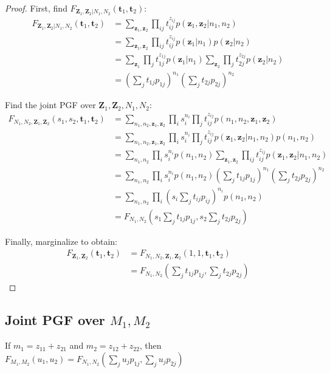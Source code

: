 \documentclass{article}
\begin{document}
\begin{proof}
First, find $F_{\mathbf{Z}_1, \mathbf{Z}_2|N_1, N_2}(\mathbf{t}_1, \mathbf{t}_2)$:
\begin{align*}
F_{\mathbf{Z}_1, \mathbf{Z}_2|N_1, N_2}(\mathbf{t}_1, \mathbf{t}_2)
&= \sum_{\mathbf{z}_1, \mathbf{z}_2} \prod_{ij} t_{ij}^{z_{ij}} p(\mathbf{z}_1, \mathbf{z}_2|n_1, n_2) \\
&= \sum_{\mathbf{z}_1, \mathbf{z}_2} \prod_{ij} t_{ij}^{z_{ij}} p(\mathbf{z}_1|n_1) p(\mathbf{z}_2|n_2) \\
&= \sum_{\mathbf{z}_1} \prod_{j} t_{1j}^{z_{1j}} p(\mathbf{z}_1|n_1) \sum_{\mathbf{z}_2} \prod_{j} t_{2j}^{z_{2j}} p(\mathbf{z}_2|n_2) \\
&= (\sum_j t_{1j} p_{1j})^{n_1} (\sum_j t_{2j} p_{2j})^{n_2}
\end{align*}

Find the joint PGF over $\mathbf{Z}_1, \mathbf{Z}_2, N_1, N_2$:
\begin{align*}
F_{N_1, N_2, \mathbf{Z}_1, \mathbf{Z}_2}(s_1, s_2, \mathbf{t}_1, \mathbf{t}_2)
&= \sum_{n_1, n_2, \mathbf{z}_1, \mathbf{z}_2} \prod_{i} s_i^{n_i} \prod_j t_{ij}^{z_{ij}} p(n_1, n_2, \mathbf{z}_1, \mathbf{z}_2) \\
&= \sum_{n_1, n_2, \mathbf{z}_1, \mathbf{z}_2} \prod_{i} s_i^{n_i} \prod_j t_{ij}^{z_{ij}} p(\mathbf{z}_1, \mathbf{z}_2|n_1, n_2) p(n_1, n_2) \\
&= \sum_{n_1, n_2} \prod_{i} s_i^{n_i} p(n_1, n_2) \sum_{\mathbf{z}_1, \mathbf{z}_2} \prod_{ij} t_{ij}^{z_{ij}} p(\mathbf{z}_1, \mathbf{z}_2|n_1, n_2) \\
&= \sum_{n_1, n_2} \prod_{i} s_i^{n_i} p(n_1, n_2) (\sum_j t_{1j} p_{1j})^{n_1} (\sum_j t_{2j} p_{2j})^{n_2} \\
&= \sum_{n_1, n_2} \prod_{i} (s_i\sum_j t_{ij} p_{ij})^{n_i} p(n_1, n_2) \\
&= F_{N_1, N_2}(s_1 \sum_j t_{1j} p_{1j}, s_2 \sum_j t_{2j} p_{2j})
\end{align*}

Finally, marginalize to obtain:
\begin{align*}
F_{\mathbf{Z}_1, \mathbf{Z}_2}(\mathbf{t}_1, \mathbf{t}_2)
&= F_{N_1, N_2, \mathbf{Z}_1, \mathbf{Z}_2}(1, 1, \mathbf{t}_1, \mathbf{t}_2) \\
&= F_{N_1, N_2}(\sum_j t_{1j} p_{1j}, \sum_j t_{2j} p_{2j})
\end{align*}

\end{proof}

\subsection{Joint PGF over $M_1, M_2$}
If $m_1 = z_{11} + z_{21}$ and $m_2 = z_{12} + z_{22}$, then $F_{M_1, M_2}(u_1, u_2) = F_{N_1, N_2}(\sum_j u_j p_{1j}, \sum_j u_j p_{2j})$
\end{document}
